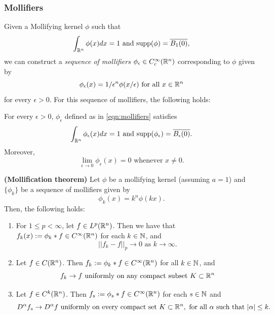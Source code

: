 \subsubsection{Mollifiers}
Given a Mollifying kernel $\phi$ such that $$\int_{\mathbb{R}^n} \phi(x)dx =1 \text{ and }\mathrm{supp}(\phi)=\overline{B_1(0)},$$  we can construct a \emph{sequence of mollifiers} $\phi_{\epsilon}\in C^{\infty}_c(\mathbb{R}^n)$ corresponding to $\phi$ given by \begin{equation}\label{eqn:mollifiers}
    \phi_{\epsilon}(x)=1/\epsilon^n \phi(x/\epsilon) \text{ for all }x\in \mathbb{R}^n
\end{equation}  
for every $\epsilon>0$.
For this sequence of mollifiers, the following holds: 
\begin{proposition}
    For every $\epsilon>0$, $\phi_{\epsilon}$ defined as in \ref{eqn:mollifiers} satisfies $$\int_{\mathbb{R}^n}\phi_{\epsilon}(x)dx =1 \text{ and }\mathrm{supp}(\phi_{\epsilon})=\overline{B_{\epsilon}(0)}.$$ Moreover, $$\lim_{\epsilon\to 0}\phi_{\epsilon}(x)=0 \text{ whenever }x\neq 0.$$ 
\end{proposition}

\begin{theorem}\textbf{(Mollification theorem)}\label{thm:mollification}
    Let $\phi$ be a mollifying kernel (assuming $a=1$) and $\{\phi_k\}$ be a sequence of mollifiers given by $$\phi_k(x)=k^n \phi(kx).$$ Then, the following holds:
    \begin{enumerate}
        \item For $1\leq p<\infty$, let $f\in L^p(\mathbb{R}^n)$. Then we have that $f_k(x):=\phi_k \ast f \in C^{\infty}(\mathbb{R}^n)$ for each $k \in \mathbb{N}$, and $$||f_k-f||_p \to 0 \text{ as }k\to \infty. $$
        \item Let $f\in C(\mathbb{R}^n)$. Then $f_k:=\phi_k \ast f\in C^{\infty}(\mathbb{R}^n)$ for all $k\in \mathbb{N}$, and $$f_k\to f \text{ uniformly on any compact subset }K\subset \mathbb{R}^n$$
        \item Let $f\in C^k(\mathbb{R}^n)$. Then $f_s:=\phi_s \ast f \in C^{\infty}(\mathbb{R}^n)$ for each $s\in \mathbb{N}$ and $$D^{\alpha}f_s \to D^{\alpha}f \text{ uniformly on every compact set }K \subset \mathbb{R}^n, \text{ for all }\alpha \text{ such that }|\alpha|\leq k. $$ 
    \end{enumerate}

\end{theorem}

